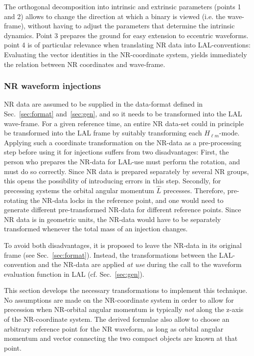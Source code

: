 \documentclass[11pt,tightenlines,article,amssymb,amsmath,amsfonts,superscriptaddress,nofootinbib]{revtex4}
\newcommand{\lNR}{\hat L}
\begin{document}
The orthogonal decomposition into intrinsic and extrinsic parameters
(points 1 and 2) allows to change the direction at which a binary is
viewed (i.e. the wave-frame), without having to adjust the parameters
that determine the intrinsic dynamics.  Point 3 prepares the ground
for easy extension to eccentric waveforms.
point 4 is of particular relevance when translating NR data into
LAL-conventions: Evaluating the vector identities in the NR-coordinate
system, yields immediately the relation between NR coordinates and
wave-frame.


\subsubsection{NR waveform injections}

NR data are assumed to be supplied in the data-format defined in
Sec.~\ref{sec:format} and~\ref{sec:gen}, and so it needs to be
transformed into the LAL wave-frame.  For a given reference time, an
entire NR data-set could in principle be transformed into the LAL
frame by suitably transforming each $H_{\ell m}$-mode.  Applying
such a coordinate transformation on the NR-data as a pre-processing step
before using it for injections suffers from two disadvantages:
First, the person who prepares the NR-data for LAL-use must perform
the rotation, and must do so correctly. Since NR data is prepared
separately by several NR groups, this opens the possibility of
introducing errors in this step.  Secondly, for precessing systems the
orbital angular momentum $\lNR$ precesses.  Therefore, pre-rotating
the NR-data locks in the reference point, and one would need to
generate different pre-transformed NR-data for different reference points.
Since NR data is in geometric units, the NR-data would have to be
separately transformed whenever the total mass of an injection changes.

To avoid both disadvantages, it is proposed to leave the NR-data in
its original frame (see Sec.~\ref{sec:format}).  Instead, the transformations between the
LAL-convention and the NR-data are applied \emph{at use} during the
call to the waveform evaluation function in LAL (cf. Sec.~\ref{sec:gen}).

This section develops the necessary transformations to implement this
technique. No assumptions are made on the NR-coordinate system in
order to allow for precession when NR-orbital angular momentum is
typically \emph{not} along the z-axis of the NR-coordinate system.
The derived formulae also allow to choose an arbitrary reference point
for the NR waveform, as long as orbital angular momentum and vector
connecting the two compact objects are known at that point.
\end{document}
